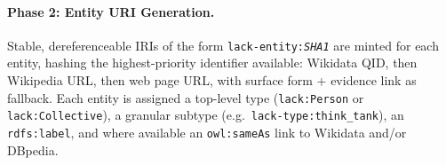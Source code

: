 \begin{sloppypar}
\paragraph{Phase 2: Entity URI Generation.}
\label{sec:construction:entities}
Stable, dereferenceable IRIs of the form \texttt{lack-entity:\textit{SHA1}} are minted for each entity, hashing the highest-priority identifier available: Wikidata QID, then Wikipedia URL, then web page URL, with surface form + evidence link as fallback.
Each entity is assigned a top-level type (\texttt{lack:Person} or \texttt{lack:Collective}), a granular subtype (e.g.\ \texttt{lack-type:think\_tank}), an \texttt{rdfs:label}, and where available an \texttt{owl:sameAs} link to Wikidata and/or DBpedia.
\end{sloppypar}

